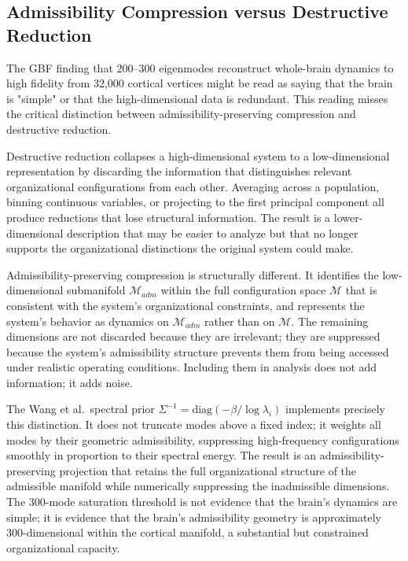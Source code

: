\documentclass[11pt,a4paper]{article}
\theoremstyle{plain}
\theoremstyle{definition}
\begin{document}
\subsection{Admissibility Compression versus Destructive Reduction}

The GBF finding that 200--300 eigenmodes reconstruct whole-brain dynamics to high
fidelity from 32,000 cortical vertices might be read as saying that the brain is
"simple" or that the high-dimensional data is redundant. This reading misses the
critical distinction between admissibility-preserving compression and destructive
reduction.

Destructive reduction collapses a high-dimensional system to a low-dimensional
representation by discarding the information that distinguishes relevant organizational
configurations from each other. Averaging across a population, binning continuous
variables, or projecting to the first principal component all produce reductions that
lose structural information. The result is a lower-dimensional description that may
be easier to analyze but that no longer supports the organizational distinctions
the original system could make.

Admissibility-preserving compression is structurally different. It identifies the
low-dimensional submanifold $\mathcal{M}_{adm}$ within the full configuration space
$\mathcal{M}$ that is consistent with the system's organizational constraints, and
represents the system's behavior as dynamics on $\mathcal{M}_{adm}$ rather than
on $\mathcal{M}$. The remaining dimensions are not discarded because they are
irrelevant; they are suppressed because the system's admissibility structure prevents
them from being accessed under realistic operating conditions. Including them in
analysis does not add information; it adds noise.

The Wang et al.\ spectral prior $\Sigma^{-1} = \mathrm{diag}(-\beta/\log\lambda_i)$
implements precisely this distinction. It does not truncate modes above a fixed index;
it weights all modes by their geometric admissibility, suppressing high-frequency
configurations smoothly in proportion to their spectral energy. The result is an
admissibility-preserving projection that retains the full organizational structure
of the admissible manifold while numerically suppressing the inadmissible dimensions.
The 300-mode saturation threshold is not evidence that the brain's dynamics are
simple; it is evidence that the brain's admissibility geometry is approximately
300-dimensional within the cortical manifold, a substantial but constrained organizational
capacity.
\end{document}
